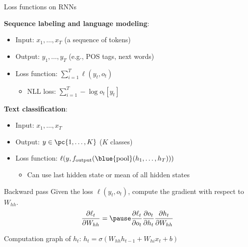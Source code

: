 \documentclass[usenames,dvipsnames,notes,11pt,aspectratio=169,hyperref={colorlinks=true, linkcolor=blue}]{beamer}
\newcommand{\pt}{\partial}
\begin{document}
\begin{frame}
    {Loss functions on RNNs}
    
    {\bf Sequence labeling and language modeling}:\\
    \begin{itemize}
        \item Input: $x_1, \ldots, x_T$ (a sequence of tokens)
        \item Output: $y_1, \ldots, y_T$ (e.g., POS tags, next words)
        \item Loss function: $\sum_{i=1}^T \ell(y_t, o_t)$
            \begin{itemize}
                \item NLL loss: $\sum_{i=1}^T -\log o_t[y_t]$
            \end{itemize}
    \end{itemize}

    \pause
    {\bf Text classification}:\\
    \begin{itemize}
        \item Input: $x_1, \ldots, x_T$
        \item Output: $y\in \pc{1,\ldots, K}$ ($K$ classes)
        \item Loss function: $\ell(y, f_{\text{output}}(\blue{\mathrm{pool}}(h_1, \ldots, h_T)))$
            \begin{itemize}
                \item Can use last hidden state or mean of all hidden states
            \end{itemize}
    \end{itemize}

\end{frame}

\begin{frame}
    {Backward pass}
    Given the loss $\ell(y_t, o_t)$, compute the gradient with respect to $W_{hh}$.
    $$
    \frac{\pt\ell_t}{\pt W_{hh}} = \pause \frac{\pt\ell_t}{\pt o_t} \frac{\pt o_t}{\pt h_t} \frac{\pt h_t}{\pt W_{hh}}
    $$

    \pause
    Computation graph of $h_t$: $h_t = \sigma(W_{hh}h_{t-1} + W_{hi}x_t + b)$
    \vspace{10em}
\end{frame}
\end{document}
